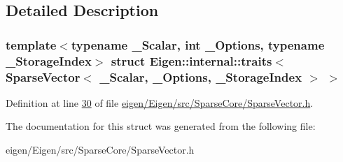 \subsection{Detailed Description}
\subsubsection*{template$<$typename \+\_\+\+Scalar, int \+\_\+\+Options, typename \+\_\+\+Storage\+Index$>$\newline
struct Eigen\+::internal\+::traits$<$ Sparse\+Vector$<$ \+\_\+\+Scalar, \+\_\+\+Options, \+\_\+\+Storage\+Index $>$ $>$}



Definition at line \hyperlink{eigen_2_eigen_2src_2_sparse_core_2_sparse_vector_8h_source_l00030}{30} of file \hyperlink{eigen_2_eigen_2src_2_sparse_core_2_sparse_vector_8h_source}{eigen/\+Eigen/src/\+Sparse\+Core/\+Sparse\+Vector.\+h}.



The documentation for this struct was generated from the following file\+:\begin{DoxyCompactItemize}
\item 
eigen/\+Eigen/src/\+Sparse\+Core/\+Sparse\+Vector.\+h\end{DoxyCompactItemize}
